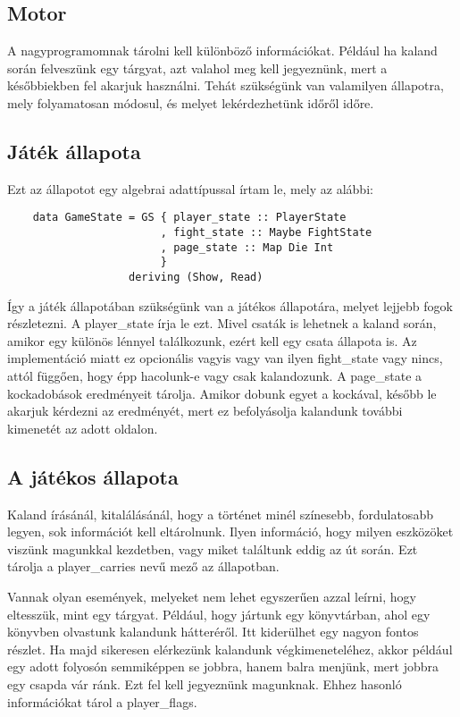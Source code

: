 \documentclass[12pt,a4paper,oneside]{report}
\newcommand{\xstate}[1]{{\color{State}#1}}
\begin{document}
    \subsection{Motor}
    A nagyprogramomnak tárolni kell különböző információkat. Például ha
    kaland során felveszünk egy tárgyat, azt valahol meg kell jegyeznünk, mert a
    későbbiekben fel akarjuk használni. Tehát szükségünk van valamilyen
    állapotra, mely folyamatosan módosul, és melyet lekérdezhetünk
    időről időre.
    \subsection{Játék állapota}
    Ezt az állapotot egy algebrai adattípussal írtam le, mely az
    alábbi:
    \begin{verbatim}
    data GameState = GS { player_state :: PlayerState
                        , fight_state :: Maybe FightState
                        , page_state :: Map Die Int
                        }
                   deriving (Show, Read)
    \end{verbatim}
    Így a játék állapotában szükségünk van a játékos állapotára,
    melyet lejjebb fogok részletezni. A \xstate{player\_state} írja le
    ezt. Mivel csaták is lehetnek a kaland során, amikor egy különös
    lénnyel találkozunk, ezért kell egy csata állapota is. Az
    implementáció miatt ez opcionális vagyis vagy van ilyen
    \xstate{fight\_state} vagy nincs, attól függően, hogy épp hacolunk-e vagy
    csak kalandozunk. A \xstate{page\_state} a kockadobások eredményeit
    tárolja. Amikor dobunk egyet a kockával, később le akarjuk
    kérdezni az eredményét, mert ez befolyásolja kalandunk további
    kimenetét az adott oldalon.
    
    \subsection{A játékos állapota}
    Kaland írásánál, kitalálásánál, hogy a történet minél színesebb,
    fordulatosabb legyen, sok információt kell eltárolnunk. Ilyen
    információ, hogy milyen eszközöket viszünk magunkkal kezdetben,
    vagy miket találtunk eddig az út során.  Ezt tárolja a
    \xstate{player\_carries} nevű mező az állapotban.

    Vannak olyan események, melyeket nem lehet egyszerűen azzal
    leírni, hogy eltesszük, mint egy tárgyat. Például, hogy jártunk
    egy könyvtárban, ahol egy könyvben olvastunk kalandunk hátteréről.
    Itt kiderülhet egy nagyon fontos részlet. Ha majd sikeresen elérkezünk
    kalandunk végkimeneteléhez, akkor például egy adott folyosón
    semmiképpen se jobbra, hanem balra menjünk, mert jobbra egy csapda
    vár ránk. Ezt fel kell jegyeznünk magunknak. Ehhez hasonló
    információkat tárol a \xstate{player\_flags}.
\end{document}
